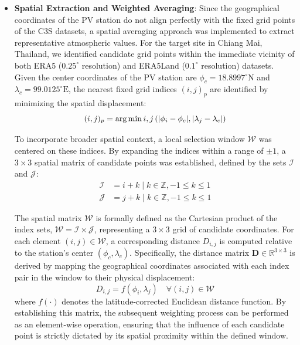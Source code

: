 \documentclass[conference]{IEEEtran}
\begin{document}
	\begin{itemize}
		\item \textbf{Spatial Extraction and Weighted Averaging}: Since the geographical coordinates of the PV station do not align perfectly with the fixed grid points of the C3S datasets, a spatial averaging approach was implemented to extract representative atmospheric values. For the target site in Chiang Mai, Thailand, we identified candidate grid points within the immediate vicinity of both ERA5 ($0.25^\circ$ resolution) and ERA5Land ($0.1^\circ$ resolution) datasets. Given the center coordinates of the PV station are $\phi_c=18.8997^\circ\text{N}$ and $\lambda_c=99.0125^\circ\text{E}$, the nearest fixed grid indices $(i, j)_{p}$ are identified by minimizing the spatial displacement:
		\begin{equation*}
			\small(i,j)_{p} = \arg\min{i, j} \left( |\phi_i - \phi_c|, |\lambda_j - \lambda_{c}| \right)
		\end{equation*}
		
		To incorporate broader spatial context, a local selection window $\mathcal{W}$ was centered on these indices. By expanding the indices within a range of $\pm 1$, a $3\times3$ spatial matrix of candidate points was established, defined by the sets $\mathcal{I}$ and $\mathcal{J}$:
		\begin{equation*}
			\begin{split}
				\mathcal{I} &= { i+k \mid k \in \mathbb{Z}, -1 \leq k \leq 1 } \\
				\mathcal{J} &= { j+k \mid k \in \mathbb{Z}, -1 \leq k \leq 1 }
			\end{split}
		\end{equation*}
		
		The spatial matrix $\mathcal{W}$ is formally defined as the Cartesian product of the index sets, $\mathcal{W} = \mathcal{I} \times \mathcal{J}$, representing a $3 \times 3$ grid of candidate coordinates. For each element $(i, j) \in \mathcal{W}$, a corresponding distance $D_{i,j}$ is computed relative to the station's center $(\phi_c, \lambda_c)$. Specifically, the distance matrix $\mathbf{D} \in \mathbb{R}^{3 \times 3}$ is derived by mapping the geographical coordinates associated with each index pair in the window to their physical displacement:
		\begin{equation*}
			D_{i,j} = f(\phi_i, \lambda_j) \quad \forall (i, j) \in \mathcal{W}
		\end{equation*}
		where $f(\cdot)$ denotes the latitude-corrected Euclidean distance function. By establishing this matrix, the subsequent weighting process can be performed as an element-wise operation, ensuring that the influence of each candidate point is strictly dictated by its spatial proximity within the defined window.
		

\end{itemize}
\end{document}
